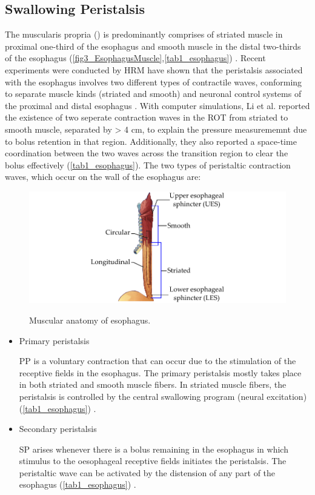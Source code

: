 \subsection{Swallowing Peristalsis}
The muscularis propria () is predominantly comprises of striated muscle in proximal one-third of the esophagus and smooth muscle in the distal two-thirds of the esophagus (\autoref{fig3_EsophagusMuscle},\autoref{tab1_esophagus}) \citep{ghosh2006physiology,mashimo2006physiology}. Recent experiments were conducted by \ac{HRM} have shown that the peristalsis associated with the esophagus involves two different types of contractile waves, conforming to separate muscle kinds (striated and smooth) and neuronal control systems of the proximal and distal esophagus \cite{Crist1984,jeong2014utilizing,ghosh2006physiology}. With computer simulations, Li et al. \cite{Li1994Analyses} reported the existence of two seperate contraction waves in the \ac{ROT} from striated to smooth muscle, separated by > 4 cm, to explain the pressure measurememnt due to bolus retention in that region. Additionally, they also reported a space-time coordination between the two waves across the transition region to clear the bolus effectively (\autoref{tab1_esophagus}). The two types of peristaltic contraction waves, which occur on the wall of the esophagus are:

\begin{figure}[bth]
	\myfloatalign
	{\includegraphics[width=\linewidth]{images/Ch2/fig3_EsophagusMuscle}} \quad
	\caption[Muscular anatomy of esophagus]{Muscular anatomy of esophagus. \citep{mashimo2006physiology}}\label{fig3_EsophagusMuscle}
\end{figure}

\begin{itemize}
	\item Primary peristalsis
	
	\ac{PP} is a voluntary contraction that can occur due to the stimulation of the receptive fields in the esophagus. The primary peristalsis mostly takes place in both striated and smooth muscle fibers. In striated muscle fibers, the peristalsis is controlled by the central swallowing program (neural excitation) (\autoref{tab1_esophagus}) \cite{Dodds1989}.
	
	\item Secondary peristalsis
	
	
	\ac{SP} arises whenever there is a bolus remaining in the esophagus in which stimulus to the oesophageal receptive fields initiates the peristalsis. The peristaltic wave can be activated by the distension of any part of the esophagus (\autoref{tab1_esophagus}) \cite{lang2009brain}.
\end{itemize}

